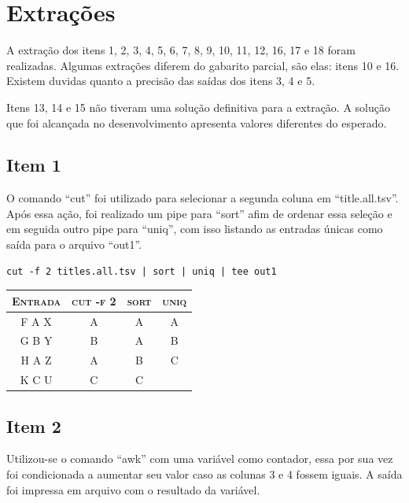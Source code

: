 \documentclass[12pt]{article}
\begin{document}
\section{Extrações}

A extração dos itens 1, 2, 3, 4, 5, 6, 7, 8, 9, 10, 11, 12, 16, 17 e 18 foram realizadas. Algumas extrações diferem do gabarito parcial, são elas: itens 10 e 16. Existem duvidas quanto a precisão das saídas dos itens 3, 4 e 5.

Itens 13, 14 e 15 não tiveram uma solução definitiva para a extração. A solução que foi alcançada no desenvolvimento apresenta valores diferentes do esperado.

\subsection*{Item 1}

O comando ``cut'' foi utilizado para selecionar a segunda coluna em ``title.all.tsv''. Após essa ação, foi realizado um pipe para ``sort'' afim de ordenar essa seleção e em seguida outro pipe para ``uniq'', com isso listando as entradas únicas como saída para o arquivo ``out1''.

\begin{verbatim}
cut -f 2 titles.all.tsv | sort | uniq | tee out1 
\end{verbatim}

\begin{table}[!h]
    \begin{tabular}{ c c c c }
        \textsc{Entrada} & \textsc{cut -f 2} & \textsc{sort} & \textsc{uniq} \\ 
        \hline
        F A X & A & A & A \\ 
        G B Y & B & A & B \\
        H A Z & A & B & C \\
        K C U & C & C &   \\
    \end{tabular}
\end{table}

\subsection*{Item 2}

Utilizou-se o comando ``awk'' com uma variável como contador, essa por sua vez foi condicionada a aumentar seu valor caso as colunas 3 e 4 fossem iguais. A saída foi impressa em arquivo com o resultado da variável.
\end{document}
